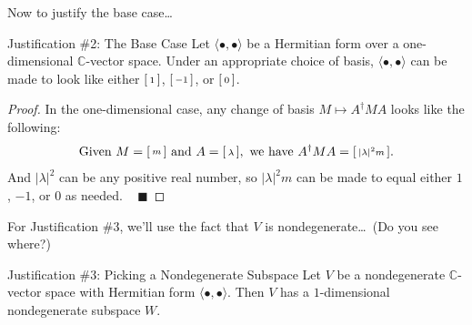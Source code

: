 Now to justify the base case\dots

\begin{theorem}{Justification \#2: The Base Case}
    Let $\langle \bullet, \bullet \rangle$ be a Hermitian form over a one-dimensional $\mathbb{C}$-vector space.  Under an appropriate choice of basis, $\langle \bullet, \bullet \rangle$ can be made to look like either $\begin{bsmallmatrix} 1 \end{bsmallmatrix}$, $\begin{bsmallmatrix} -1 \end{bsmallmatrix}$, or $\begin{bsmallmatrix} 0 \end{bsmallmatrix}$.
\end{theorem}

\begin{proof}
    In the one-dimensional case, any change of basis $M \mapsto A^{\dagger}MA$ looks like the following:
    \[ \text{Given } M = \begin{bsmallmatrix} m \end{bsmallmatrix} \text{ and } A = \begin{bsmallmatrix} \lambda \end{bsmallmatrix}, ~ \text{we have } A^{\dagger}MA = \begin{bsmallmatrix} |\lambda|^2  m \end{bsmallmatrix}. \]
    And $|\lambda|^2$ can be any positive real number, so $|\lambda|^2m$ can be made to equal either $1$, $-1$, or $0$ as needed. ~ $\blacksquare$
\end{proof}

For Justification \#3, we'll use the fact that $V$ is nondegenerate\dots \ (Do you see where?)

\begin{theorem}{Justification \#3: Picking a Nondegenerate Subspace}
    Let $V$ be a nondegenerate $\mathbb{C}$-vector space with Hermitian form $\langle \bullet, \bullet \rangle$.  Then $V$ has a $1$-dimensional nondegenerate subspace $W$.
\end{theorem}

